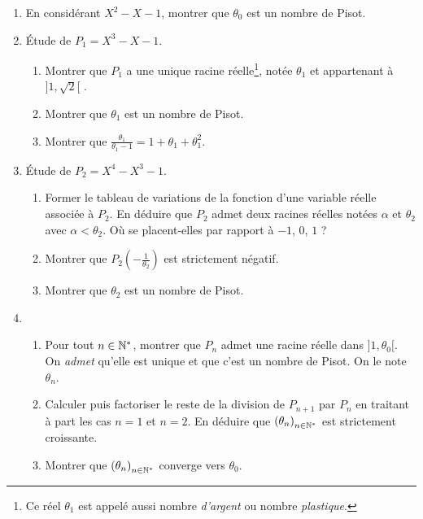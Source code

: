 \begin{enumerate}
 \item En considérant $X^2-X-1$, montrer que $\theta_0$ est un nombre de Pisot.
 \item \'Etude de $P_1=X^3-X-1$.
\begin{enumerate}
 \item Montrer que $P_1$ a une unique racine réelle\footnote{Ce réel $\theta_1$ est appelé aussi nombre \emph{d'argent} ou nombre \emph{plastique}.}, notée $\theta_1$ et appartenant à $]1,\sqrt{2}[$ .
 \item Montrer que $\theta_1$ est un nombre de Pisot.
 \item Montrer que $\frac{\theta_1}{\theta_1-1}=1+\theta_1+\theta_1^2$.
\end{enumerate}
 \item \'Etude de $P_2=X^4-X^3-1$.
 \begin{enumerate}
  \item Former le tableau de variations de la fonction d'une variable réelle associée à $P_2$. En déduire que $P_2$ admet deux racines réelles notées $\alpha$ et $\theta_2$ avec $\alpha < \theta_2$. Où se placent-elles par rapport à $-1$, $0$, $1$ ?
  \item Montrer que $P_2(-\frac{1}{\theta_2})$ est strictement négatif.
  \item Montrer que $\theta_2$ est un nombre de Pisot.
 \end{enumerate}
\item 
\begin{enumerate}
 \item Pour tout $n\in\mathbb{N}^*$, montrer que $P_n$ admet une racine réelle dans $]1,\theta_0[$.\newline
 On \emph{admet} qu'elle est unique et que c'est un nombre de Pisot. On le note  $\theta_n$.
 \item Calculer puis factoriser le reste de la division de $P_{n+1}$ par $P_n$ en traitant à part les cas $n=1$ et $n=2$. En déduire que $\left( \theta_n\right) _{n\in \mathbb{N}^*}$ est strictement croissante.
 \item Montrer que $\left(\theta_n\right) _{n\in \mathbb{N}^*}$ converge vers $\theta_0$.
\end{enumerate}

\end{enumerate}

